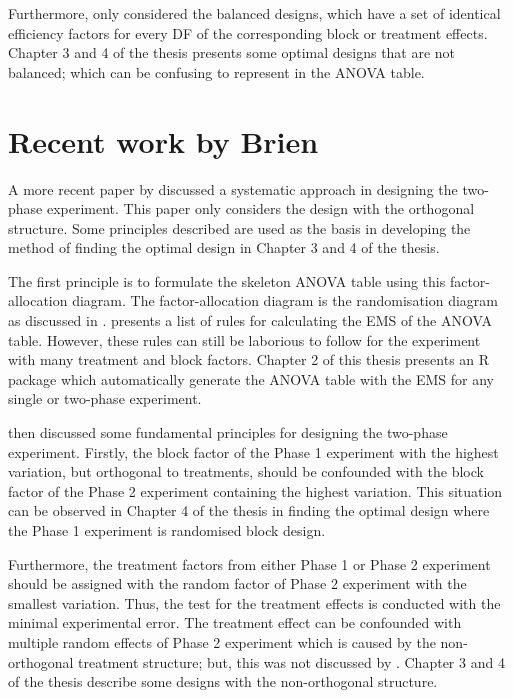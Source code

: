 \documentclass[11pt,a4paper]{article}
\begin{document}
Furthermore, \cite{Brien2009, Brien2010} only considered the balanced designs, which have a set of identical efficiency factors for every DF of the corresponding block or treatment effects. Chapter 3 and 4 of the thesis presents some optimal designs that are not balanced; which can be confusing to represent in the ANOVA table.  
 
\section{Recent work by Brien}
\label{sec:brien2011}
A more recent paper by \cite{Brien2011} discussed a systematic approach in designing the two-phase experiment. This paper only considers the design with the orthogonal structure. Some principles described are used as the basis in developing the method of finding the optimal design in Chapter 3 and 4 of the thesis. 

The first principle is to formulate the skeleton ANOVA table using this factor-allocation diagram. The factor-allocation diagram is the randomisation diagram as discussed in \cite{Brien2006b}. \cite{Brien2011} presents a list of rules for calculating the EMS of the ANOVA table. However, these rules can still be laborious to follow for the experiment with many treatment and block factors. Chapter 2 of this thesis presents an R package which automatically generate the ANOVA table with the EMS for any single or two-phase experiment. 

\cite{Brien2011} then discussed some fundamental principles for designing the two-phase experiment. Firstly, the block factor of the Phase 1 experiment with the highest variation, but orthogonal to treatments, should be confounded with the block factor of the Phase 2 experiment containing the highest variation. This situation can be observed in Chapter 4 of the thesis in finding the optimal design where the Phase 1 experiment is randomised block design. 

Furthermore, the treatment factors from either Phase 1 or Phase 2 experiment should be assigned with the random factor of Phase 2 experiment with the smallest variation. Thus, the test for the treatment effects is conducted with the minimal experimental error. The treatment effect can be confounded with multiple random effects of Phase 2 experiment which is caused by the non-orthogonal treatment structure; but, this was not discussed by \cite{Brien2011}. Chapter 3 and 4 of the thesis describe some designs with the non-orthogonal structure. 
\end{document}
